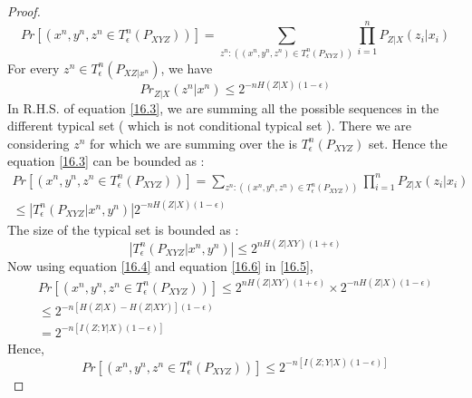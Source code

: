 \documentclass{article}
\begin{document}
\begin{proof}
\begin{equation}
	Pr \left[ \left( x^n,y^n,z^n \in T^{n}_{\epsilon} \left(  P_{XYZ} \right)\right)\right] = \sum_{z^{n} : \left( (x^n,y^n,z^n )\in T^{n}_{\epsilon} \left(  P_{XYZ} \right) \right) } \prod_{i = 1}^{n} P_{Z|X} \left( z_{i}|x_{i}\right) \label{16.3}
\end{equation}
For every $z^{n} \in T^{n}_{\epsilon} \left( P_{XZ|x^n}\right)$, we have
\begin{equation}
	Pr_{Z|X}\left( z^n | x^n \right) \leq  2^{-nH(Z|X) (1 -\epsilon)} \label{16.4}
\end{equation}
In R.H.S. of equation \eqref{16.3}, we are summing all the possible sequences in the different typical set ( which is not conditional typical set ). There we are considering $z^n$ for which we are summing over the is   $T^{n}_{\epsilon} \left(  P_{XYZ} \right) $ set. Hence the equation \eqref{16.3} can be bounded as :
\begin{multline}
Pr \left[ \left( x^n,y^n,z^n \in T^{n}_{\epsilon} \left(  P_{XYZ} \right)\right)\right] = \sum_{z^{n} : \left( (x^n,y^n,z^n )\in T^{n}_{\epsilon} \left(  P_{XYZ} \right) \right) } \prod_{i = 1}^{n} P_{Z|X} \left( z_{i}|x_{i}\right) \\ \leq  |T^{n}_{\epsilon} \left(  P_{XYZ}| x^n, y^n \right) |2^{-nH(Z|X) (1 -\epsilon)}\label{16.5}
\end{multline}
The size of the typical set is bounded as :
\begin{equation}
	|T^{n}_{\epsilon} \left(  P_{XYZ} |x^n, y^n \right) | \leq  2^{nH(Z|XY) (1 +\epsilon)} \label{16.6}
\end{equation}
Now using equation \eqref{16.4} and equation \eqref{16.6} in \eqref{16.5},
\begin{align*}
	Pr \left[ \left( x^n,y^n,z^n \in T^{n}_{\epsilon} \left(  P_{XYZ} \right)\right)\right] \leq  2^{nH(Z|XY) (1 +\epsilon)} \times  2^{-nH(Z|X) (1 -\epsilon)}\\ \leq 2^{ -n \left[ H(Z|X) - H(Z|XY) \right] (1- \epsilon)} \\ = 2^{ -n \left[I\left( Z ; Y|X\right)(1-\epsilon)\right]}
\end{align*}
Hence,
\begin{equation}
Pr \left[ \left( x^n,y^n,z^n \in T^{n}_{\epsilon} \left(  P_{XYZ} \right)\right)\right] \leq 2^{ -n \left[I\left( Z ; Y|X\right)(1-\epsilon)\right]}
\end{equation}
\end{proof}
\end{document}

